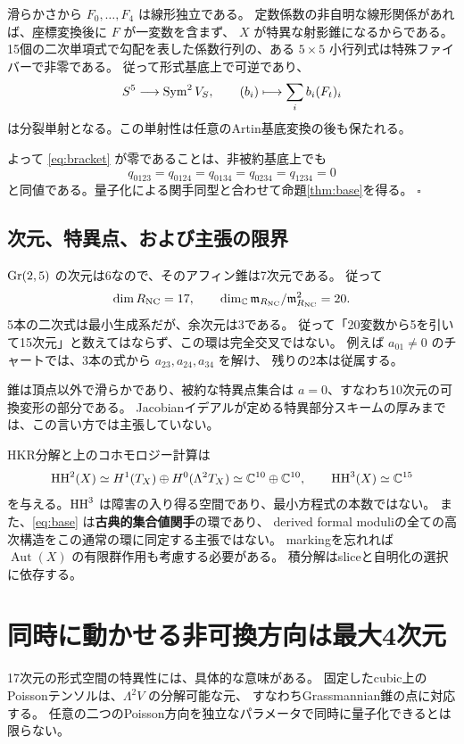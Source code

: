 滑らかさから $F_0,\ldots,F_4$ は線形独立である。
定数係数の非自明な線形関係があれば、座標変換後に $F$ が一変数を含まず、
$X$ が特異な射影錐になるからである。
15個の二次単項式で勾配を表した係数行列の、ある $5\times5$ 小行列式は特殊ファイバーで非零である。
従って形式基底上で可逆であり、
\[
 S^5\longrightarrow\operatorname{Sym}^2V_S,\qquad (b_i)\longmapsto\sum_i b_i(F_t)_i
\]
は分裂単射となる。この単射性は任意のArtin基底変換の後も保たれる。

よって \eqref{eq:bracket} が零であることは、非被約基底上でも
\[
 q_{0123}=q_{0124}=q_{0134}=q_{0234}=q_{1234}=0
\]
と同値である。量子化による関手同型と合わせて命題\ref{thm:base}を得る。
\hfill$\square$

\subsection{次元、特異点、および主張の限界}

$\operatorname{Gr}(2,5)$ の次元は6なので、そのアフィン錐は7次元である。
従って
\[
 \dim R_{\operatorname{NC}}=17,\qquad
 \dim_\mathbb C\mathfrak m_{R_{\operatorname{NC}}}/\mathfrak m_{R_{\operatorname{NC}}}^2=20.
\]
5本の二次式は最小生成系だが、余次元は3である。
従って「20変数から5を引いて15次元」と数えてはならず、この環は完全交叉ではない。
例えば $a_{01}\ne0$ のチャートでは、3本の式から $a_{23},a_{24},a_{34}$ を解け、
残りの2本は従属する。

錐は頂点以外で滑らかであり、被約な特異点集合は $a=0$、すなわち10次元の可換変形の部分である。
Jacobianイデアルが定める特異部分スキームの厚みまでは、この言い方では主張していない。

HKR分解と上のコホモロジー計算は
\[
 \operatorname{HH}^2(X)\simeq H^1(T_X)\oplus H^0(\Lambda^2T_X)\simeq\mathbb C^{10}\oplus\mathbb C^{10},
 \qquad \operatorname{HH}^3(X)\simeq\mathbb C^{15}
\]
を与える\cite{May}。$\operatorname{HH}^3$ は障害の入り得る空間であり、最小方程式の本数ではない。
また、\eqref{eq:base} は\textbf{古典的集合値関手}の環であり、
derived formal moduliの全ての高次構造をこの通常の環に同定する主張ではない。
markingを忘れれば $\operatorname{Aut}(X)$ の有限群作用も考慮する必要がある。
積分解はsliceと自明化の選択に依存する。

\section{同時に動かせる非可換方向は最大4次元}

17次元の形式空間の特異性には、具体的な意味がある。
固定したcubic上のPoissonテンソルは、$\Lambda^2V$ の分解可能な元、
すなわちGrassmannian錐の点に対応する\cite[Theorem 1]{May}。
任意の二つのPoisson方向を独立なパラメータで同時に量子化できるとは限らない。

